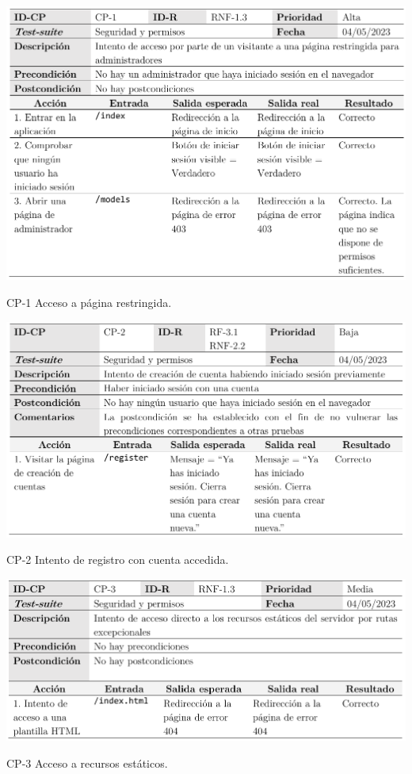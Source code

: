\begin{table}[p]
	\centering
	\includegraphics[width=\textwidth]{../img/anexos/cp/CP-1}
	\caption{CP-1 Acceso a página restringida.}
	\label{cp:acc-restringido}
\end{table}

\begin{table}[p]
	\centering
	\includegraphics[width=\textwidth]{../img/anexos/cp/CP-2}
	\caption{CP-2 Intento de registro con cuenta accedida.}
	\label{cp:registro}
\end{table}

\begin{table}[p]
	\centering
	\includegraphics[width=\textwidth]{../img/anexos/cp/CP-3}
	\caption{CP-3 Acceso a recursos estáticos.}
	\label{cp:acc-html}
\end{table}

